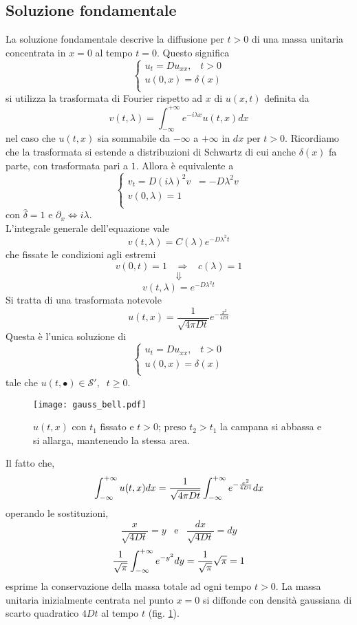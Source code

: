 \subsection{Soluzione fondamentale}
La soluzione fondamentale descrive la diffusione per $t>0$ di una massa unitaria concentrata in $x=0$ al tempo $t=0$. Questo significa
\[
	\left\{
	\begin{array}{l}
		u_t=Du_{xx}, \;\;\; t>0 \\
		u(0,x)= \delta(x)  \\
	\end{array}
	\right.
\]
si utilizza la trasformata di Fourier rispetto ad $x$ di $u(x,t)$ definita da 
\[
	v(t,\lambda)=\int_{-\infty}^{+\infty} e^{-i\lambda x} u(t,x) dx
\]
nel caso che $u(t,x)$ sia sommabile da $- \infty$ a $+ \infty$ in $dx$ per $t>0$. Ricordiamo che la trasformata si estende a distribuzioni di Schwartz
di cui anche $\delta (x)$ fa parte, con trasformata pari a $1$.
Allora \`e equivalente a
\[
	\left\{
	\begin{array}{l}
		v_t=D\left( i\lambda \right)^2 v \;\; = -D\lambda^2 v\\
		v(0,\lambda)= 1  \\
	\end{array}
	\right.
\]
con $\hat{\delta}= 1$ e $\partial_x \Leftrightarrow i\lambda$.\\
L'integrale generale dell'equazione vale
\[
	v(t,\lambda)= C(\lambda)e^{-D\lambda^2 t}
\]
che fissate le condizioni agli estremi
\[
	v(0,t)= 1 \;\;\; \Rightarrow \;\;\; c(\lambda)= 1
\]
\[
	\Downarrow
\]
\[
	v(t,\lambda)= e^{-D\lambda^2 t}
\]
Si tratta di una trasformata notevole
\[
	u(t,x)= \frac{1}{\sqrt{4 \pi D t}}
	e^{-\frac{x^2}{4Dt}}
\]
Questa \`e l'unica soluzione di 
\[
	\left\{
	\begin{array}{l}
		u_t=Du_{xx}, \;\;\; t>0 \\
		u(0,x)= \delta(x)  \\
	\end{array}
	\right.
\]
tale che $u(t, \bullet) \in \mathcal{S'}, \;\; t \geq 0$.
\begin{figure}[H]
	\centering
	\texttt{[image: gauss\_bell.pdf]}
	\caption{$u(t,x)$ con $t_1$ fissato e $t>0$; preso $t_2>t_1$ la campana si abbassa e si allarga, mantenendo la stessa area.}
	\label{gauss_bell}
\end{figure}
Il fatto che,
\[
	\int_{- \infty}^{+ \infty} u(t,x) dx = 
	\frac{1}{\sqrt{4 \pi D t}}
	\int_{- \infty}^{+ \infty} e^{-\frac{x^2}{4Dt}} dx
\]
operando le sostituzioni,
\[
\frac{x}{\sqrt{4Dt}}= y \;\;\; \text{e} \;\;\; \frac{dx}{\sqrt{4Dt}}= dy
\]
\[
	\frac{1}{\sqrt{\pi}}\int_{- \infty}^{+ \infty} e^{-y^2} dy= \frac{1}{\sqrt{\pi}}\sqrt{\pi}=1
\]
esprime la conservazione della massa totale ad ogni tempo $t>0$.
La massa unitaria inizialmente centrata nel punto $x=0$ si diffonde con densit\`a gaussiana di scarto quadratico $4Dt$ al tempo $t$ (fig. \ref{gauss_bell}).
